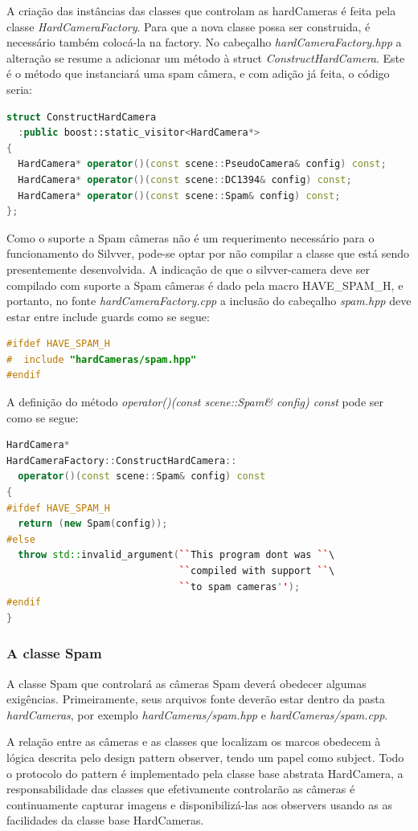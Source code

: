 \documentclass[a4paper,10pt]{article}
\begin{document}
A criação das instâncias das classes que controlam as hardCameras é feita pela
classe \emph{HardCameraFactory}. Para que a nova classe possa ser construida,
é necessário também colocá-la na factory. No cabeçalho
\emph{hardCameraFactory.hpp} a alteração se resume a adicionar um método à
struct \emph{ConstructHardCamera}. Este é o método que instanciará uma spam
câmera, e com adição já feita, o código seria:
\begin{lstlisting}[frame=lines,language=c++]
struct ConstructHardCamera
  :public boost::static_visitor<HardCamera*>
{
  HardCamera* operator()(const scene::PseudoCamera& config) const;
  HardCamera* operator()(const scene::DC1394& config) const;
  HardCamera* operator()(const scene::Spam& config) const;
};
\end{lstlisting}
Como o suporte a Spam câmeras não é um requerimento necessário para o
funcionamento do Silvver, pode-se optar por não compilar a classe que está
sendo presentemente desenvolvida. A indicação de que o silvver-camera deve ser
compilado com suporte a Spam câmeras é dado pela macro HAVE\_SPAM\_H, e
portanto, no fonte \emph{hardCameraFactory.cpp} a inclusão do cabeçalho
\emph{spam.hpp} deve estar entre include guards como se segue:
\begin{lstlisting}[frame=lines,language=c++]
#ifdef HAVE_SPAM_H
#  include "hardCameras/spam.hpp"
#endif
\end{lstlisting}
A definição do método \emph{operator()(const scene::Spam\& config) const} pode
ser como se segue:
\begin{lstlisting}[frame=lines,language=c++]
HardCamera*
HardCameraFactory::ConstructHardCamera::
  operator()(const scene::Spam& config) const
{
#ifdef HAVE_SPAM_H
  return (new Spam(config));
#else
  throw std::invalid_argument(``This program dont was ``\
                              ``compiled with support ``\
                              ``to spam cameras'');
#endif
}
\end{lstlisting}

\subsubsection{A classe Spam}
A classe Spam que controlará as câmeras Spam deverá obedecer algumas
exigências. Primeiramente, seus arquivos fonte deverão estar dentro da pasta
\emph{hardCameras}, por exemplo \emph{hardCameras/spam.hpp} e
\emph{hardCameras/spam.cpp}.

A relação entre as câmeras e as classes que localizam os marcos obedecem à
lógica descrita pelo design pattern observer, tendo um papel como
subject. Todo o protocolo do pattern é implementado pela classe base abstrata
HardCamera, a responsabilidade das classes que efetivamente controlarão as
câmeras é continuamente capturar imagens e disponibilizá-las aos observers
usando as as facilidades da classe base HardCameras.
\end{document}
